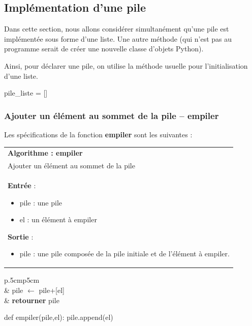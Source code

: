 \documentclass[10pt,fleqn]{article} %
\begin{document}
\subsection{Implémentation d'une pile}
Dans cette section, nous allons considérer simultanément qu'une pile est implémentée sous forme d'une liste. Une autre méthode (qui n'est pas au programme serait de créer une nouvelle classe d'objets Python).

\begin{rappel}
Ainsi, pour déclarer une pile, on utilise la méthode usuelle pour l'initialisation d'une liste. 
\begin{python}
pile_liste = []
\end{python}
\end{rappel}

\subsubsection{Ajouter un élément au sommet de la pile -- \textbf{empiler}}
Les spécifications de la fonction \textbf{empiler} sont les suivantes :

\begin{tabular}{p{\linewidth}}
\hline
\textbf{Algorithme : empiler} \\
Ajouter un élément au sommet de la pile \\
\hline
\textbf{Entrée} : 
\begin{itemize}
\item pile : une pile
\item el : un élément à empiler
\end{itemize}
\textbf{Sortie} : 
\begin{itemize}
\item pile  : une pile composée de la pile initiale et de l'élément à empiler.
\end{itemize} \\
\hline 
\end{tabular}

\vspace{.5cm}

\noindent \begin{minipage}[c]{.48\linewidth}
\begin{pseudo}
\begin{tabular}{p{.5cm}p{5cm}}
\hline
{}  \\
& pile $\leftarrow$ pile+[el] \\
& \textbf{retourner} pile \\
\hline
\end{tabular}
\end{pseudo}
\end{minipage}\hfill
\begin{minipage}[c]{.48\linewidth}
\begin{py}
\begin{python}
def empiler(pile,el):
    pile.append(el)
\end{python}
\end{py}
\end{minipage}
\end{document}
